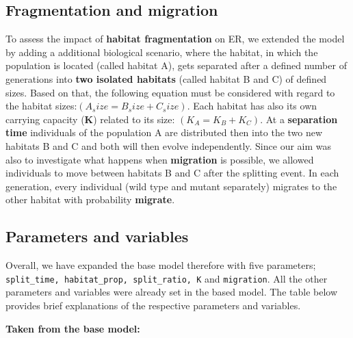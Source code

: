 \documentclass[
]{article}
\begin{document}
\subsection{Fragmentation and
migration}\label{fragmentation-and-migration}

To assess the impact of \textbf{habitat fragmentation} on ER, we
extended the model by adding a additional biological scenario, where the
habitat, in which the population is located (called habitat A), gets
separated after a defined number of generations into \textbf{two
isolated habitats} (called habitat B and C) of defined sizes. Based on
that, the following equation must be considered with regard to the
habitat sizes:\((A_size = B_size + C_size)\). Each habitat has also its
own carrying capacity (\textbf{K}) related to its size:
\((K_A = K_B + K_C)\). At a \textbf{separation time} individuals of the
population A are distributed then into the two new habitats B and C and
both will then evolve independently. Since our aim was also to
investigate what happens when \textbf{migration} is possible, we allowed
individuals to move between habitats B and C after the splitting event.
In each generation, every individual (wild type and mutant separately)
migrates to the other habitat with probability \textbf{migrate}.

\subsection{Parameters and variables}\label{parameters-and-variables}

Overall, we have expanded the base model therefore with five parameters;
\texttt{split\_time,\ habitat\_prop,\ split\_ratio,\ K} and
\texttt{migration}. All the other parameters and variables were already
set in the based model. The table below provides brief explanations of
the respective parameters and variables.

\textbf{Taken from the base model:}
\end{document}

